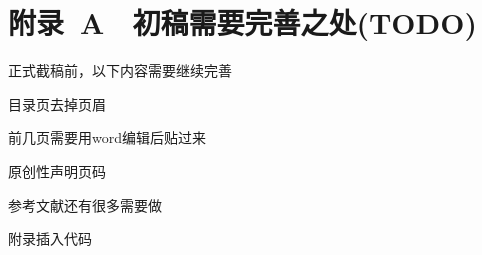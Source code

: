﻿%

\chapter*{\hfill 附录~A　初稿需要完善之处(TODO) \hfill}

正式截稿前，以下内容需要继续完善

\begin{asparaenum}
\item 目录页去掉页眉
\item 前几页需要用word编辑后贴过来
\item 原创性声明页码
\item 参考文献还有很多需要做
\item 附录插入代码
\end{asparaenum}
